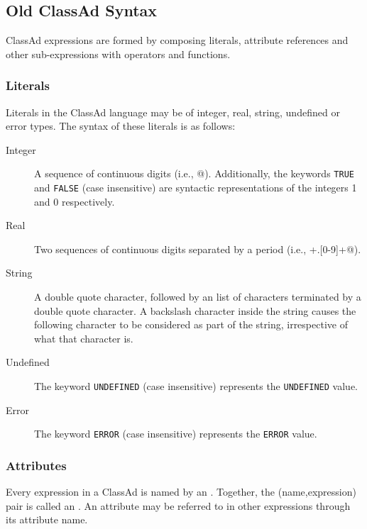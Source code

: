 \subsection{Old ClassAd Syntax}
ClassAd expressions are formed by composing literals, attribute references and 
other sub-expressions with operators and functions. 
\subsubsection{Literals}
\label{ClassAd:literals}
Literals in the ClassAd language may be of integer, real, string, undefined or 
error types.  The syntax of these literals is as follows:
\begin{description}
	\item[Integer]  A sequence of continuous digits (i.e., \verb@[0-9]@).
		Additionally, the keywords \verb+TRUE+ and \verb+FALSE+ (case
		insensitive) are syntactic representations of the integers 1 and 0 
		respectively.

	\item[Real] Two sequences of continuous digits separated by a period
		(i.e., \verb@[0-9]+.[0-9]+@).

	\item[String] A double quote character, followed by an list of characters
		terminated by a double quote character.  A backslash character inside
		the string causes the following character to be considered as part of
		the string, irrespective of what that character is.

	\item[Undefined] The keyword \texttt{UNDEFINED} (case insensitive)
		represents the \texttt{UNDEFINED} value.

	\item[Error] The keyword \texttt{ERROR} (case insensitive)
		represents the \texttt{ERROR} value.
\end{description}

\subsubsection{Attributes}
Every expression in a ClassAd is named by an .  Together,
the (name,expression) pair is called an .  An attribute may be
referred to in other expressions through its attribute name.

